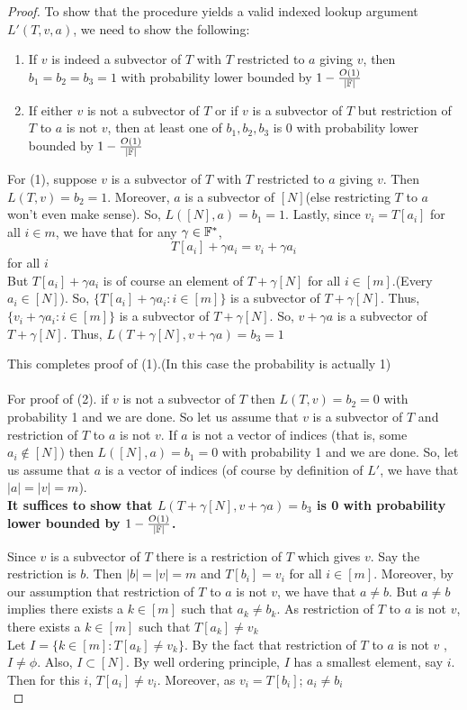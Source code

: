 \begin{proof}
    To show that the procedure yields a valid indexed lookup argument $L'(T, v, a)$, we need to show the following:
    \begin{enumerate}

        \item If $v$ is indeed a subvector of $T$ with $T$ restricted to $a$ giving $v$, then $b_1=b_2=b_3=1$ with probability lower bounded by $1-\frac{O(1)}{|\mathbb{F}|}$
        \item If either $v$ is not a subvector of $T$ or if $v$ is a subvector of $T$ but restriction of $T$ to $a$ is not $v$, then at least one of $b_1, b_2, b_3$ is $0$ with probability lower bounded by $1-\frac{O(1)}{|\mathbb{F}|}$
    \end{enumerate}

    For (1), suppose $v$ is a subvector of $T$ with $T$ restricted to $a$ giving $v$. Then $L(T, v)=b_2=1$.
    Moreover, $a$ is a subvector of $[N]$(else restricting $T$ to $a$ won't even make sense).
    So, $L([N], a)=b_1=1$.
    Lastly, since $v_i=T[a_i]$ for all $i \in m$, we have that for any $\gamma \in \mathbb{F}^{*}$,
    $$T[a_i]+\gamma a_i=v_i+\gamma a_i$$ for all $i$ \\
    But $T[a_i]+\gamma a_i$ is of course an element of $T+\gamma [N] $ for all $i \in [m]$.(Every $a_i \in [N]$).
    So, $\{T[a_i]+\gamma a_i:i \in [m]\}$ is a subvector of $T+\gamma [N] $.
    Thus, $\{v_i+\gamma a_i:i \in [m]\}$ is a subvector of $T+\gamma [N] $.
    So, $v+\gamma a$ is a subvector of $T+\gamma [N] $.
    Thus, $L(T+\gamma[N], v+\gamma a)=b_3=1$

    This completes proof of (1).(In this case the probability is actually 1) \\\\
    For proof of (2). if $v$ is not a subvector of $T$ then $L(T, v)=b_2=0$ with probability 1 and we are done.
    So let us assume that $v$ is a subvector of $T$ and restriction of $T$ to $a$ is not $v$.
    If $a$ is not a vector of indices (that is, some $a_i \notin [N]$) then $L([N], a)=b_1=0$ with probability 1 and we are done.
    So, let us assume that $a$ is a vector of indices (of course by definition of $L'$, we have that $|a|=|v|=m$).\\
    \textbf{It suffices to show that $L(T+\gamma[N], v+\gamma a)=b_3$ is 0 with probability lower bounded by $1-\frac{O(1)}{|\mathbb{F}|}$.}

    Since $v$ is a subvector of $T$ there is a restriction of $T$ which gives $v$. Say the restriction is $b$. Then $|b|=|v|=m$ and $T[b_i]=v_i$ for all $i \in [m]$.
    Moreover, by our assumption that restriction of $T$ to $a$ is not $v$, we have that $a \neq b$.
    But $a\neq b$ implies there exists a $k \in [m]$ such that $a_k\neq b_k$.
    As restriction of $T$ to $a$ is not $v$, there exists a $k \in [m]$ such that $T[a_k]\neq v_k$\\
    Let $I=\{k \in [m]: T[a_k]\neq v_k\}$.
    By the fact that restriction of $T$ to $a$ is not $v$ , $I \neq \phi$.
    Also, $I \subset [N]$.
    By well ordering principle, $I$ has a smallest element, say $i$.
    Then for this $i$, $T[a_i]\neq v_i$. Moreover, as $v_i=T[b_i]$; $a_i \neq b_i$ \\


\end{proof}
